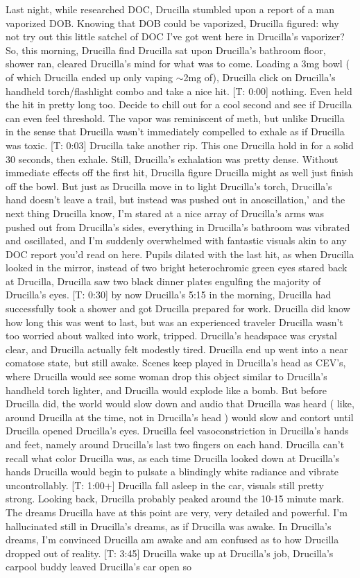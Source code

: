 \documentclass[12pt]{book}
\begin{document}
Last night, while researched DOC, Drucilla stumbled upon a report of a man vaporized DOB. Knowing that DOB could be vaporized, Drucilla figured: why not try out this little satchel of DOC I've got went here in Drucilla's vaporizer? So, this morning, Drucilla find Drucilla sat upon Drucilla's bathroom floor, shower ran, cleared Drucilla's mind for what was to come. Loading a 3mg bowl ( of which Drucilla ended up only vaping $\sim$2mg of), Drucilla click on Drucilla's handheld torch/flashlight combo and take a nice hit. [T: 0:00] nothing. Even held the hit in pretty long too. Decide to chill out for a cool second and see if Drucilla can even feel threshold. The vapor was reminiscent of meth, but unlike Drucilla in the sense that Drucilla wasn't immediately compelled to exhale as if Drucilla was toxic. [T: 0:03] Drucilla take another rip. This one Drucilla hold in for a solid 30 seconds, then exhale. Still, Drucilla's exhalation was pretty dense. Without immediate effects off the first hit, Drucilla figure Drucilla might as well just finish off the bowl. But just as Drucilla move in to light Drucilla's torch, Drucilla's hand doesn't leave a trail, but instead was pushed out in anoscillation,' and the next thing Drucilla know, I'm stared at a nice array of Drucilla's arms was pushed out from Drucilla's sides, everything in Drucilla's bathroom was vibrated and oscillated, and I'm suddenly overwhelmed with fantastic visuals akin to any DOC report you'd read on here. Pupils dilated with the last hit, as when Drucilla looked in the mirror, instead of two bright heterochromic green eyes stared back at Drucilla, Drucilla saw two black dinner plates engulfing the majority of Drucilla's eyes. [T: 0:30] by now Drucilla's 5:15 in the morning, Drucilla had successfully took a shower and got Drucilla prepared for work. Drucilla did know how long this was went to last, but was an experienced traveler Drucilla wasn't too worried about walked into work, tripped. Drucilla's headspace was crystal clear, and Drucilla actually felt modestly tired. Drucilla end up went into a near comatose state, but still awake. Scenes keep played in Drucilla's head as CEV's, where Drucilla would see some woman drop this object similar to Drucilla's handheld torch lighter, and Drucilla would explode like a bomb. But before Drucilla did, the world would slow down and audio that Drucilla was heard ( like, around Drucilla at the time, not in Drucilla's head ) would slow and contort until Drucilla opened Drucilla's eyes. Drucilla feel vasoconstriction in Drucilla's hands and feet, namely around Drucilla's last two fingers on each hand. Drucilla can't recall what color Drucilla was, as each time Drucilla looked down at Drucilla's hands Drucilla would begin to pulsate a blindingly white radiance and vibrate uncontrollably. [T: 1:00+] Drucilla fall asleep in the car, visuals still pretty strong. Looking back, Drucilla probably peaked around the 10-15 minute mark. The dreams Drucilla have at this point are very, very detailed and powerful. I'm hallucinated still in Drucilla's dreams, as if Drucilla was awake. In Drucilla's dreams, I'm convinced Drucilla am awake and am confused as to how Drucilla dropped out of reality. [T: 3:45] Drucilla wake up at Drucilla's job, Drucilla's carpool buddy leaved Drucilla's car open so 
\end{document}
